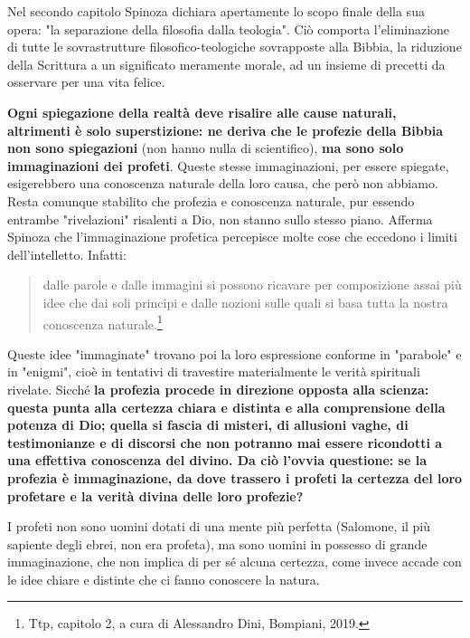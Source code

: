 Nel secondo capitolo Spinoza dichiara apertamente lo scopo finale della sua opera: "la separazione della filosofia dalla teologia". Ciò comporta l'eliminazione di tutte le sovrastrutture filosofico-teologiche sovrapposte alla Bibbia, la riduzione della
Scrittura a un significato meramente morale, ad un insieme di precetti da osservare per una vita felice.

\textbf{Ogni spiegazione della realtà deve risalire alle cause naturali, altrimenti
è solo superstizione: ne deriva che le profezie della Bibbia non
sono spiegazioni} (non hanno nulla di scientifico), \textbf{ma sono solo immaginazioni dei profeti}. Queste
stesse immaginazioni, per essere spiegate, esigerebbero una conoscenza naturale della loro causa,
che però non abbiamo. Resta comunque stabilito che profezia e conoscenza naturale, pur essendo
entrambe "rivelazioni" risalenti a Dio, non stanno sullo
stesso piano. Afferma Spinoza che l'immaginazione profetica percepisce
molte cose che eccedono i limiti dell'intelletto. Infatti: 

\begin{quotation}
	\small dalle parole e dalle immagini si possono
	ricavare per composizione assai più idee che dai soli principi e dalle nozioni sulle quali si basa tutta
	la nostra conoscenza naturale.\footnote{Ttp, capitolo 2, a cura di Alessandro Dini, Bompiani, 2019.}
\end{quotation}

Queste idee "immaginate" trovano poi la loro espressione
conforme in "parabole" e in "enigmi", cioè in tentativi di travestire materialmente le verità spirituali
rivelate. Sicché \textbf{la profezia procede in direzione opposta alla scienza: questa punta alla
certezza chiara e distinta e alla comprensione della potenza di Dio; quella si fascia di misteri, di allusioni vaghe, di testimonianze e di discorsi che non potranno
mai essere ricondotti a una effettiva conoscenza del divino. Da ciò l'ovvia questione: se
la profezia è immaginazione,
da dove trassero i profeti la certezza del loro profetare e la verità divina
delle loro profezie?}



I profeti non sono uomini dotati di una mente più perfetta
(Salomone, il più sapiente degli ebrei, non era profeta), ma sono uomini in possesso di grande immaginazione, che non implica di per sé alcuna certezza, come invece accade con le idee chiare e
distinte che ci fanno conoscere la natura.

